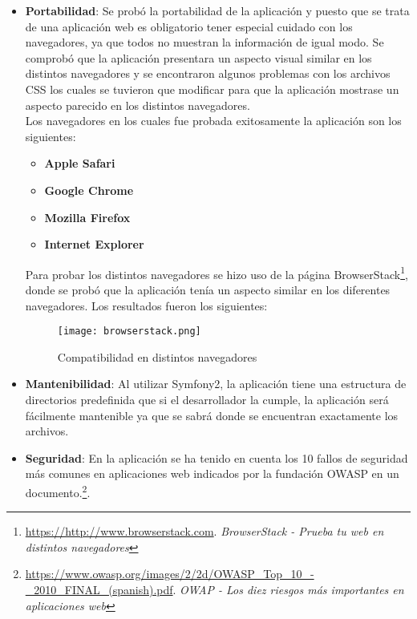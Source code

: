 \begin{itemize}
\item \textbf{Portabilidad}: Se probó la portabilidad de la aplicación y puesto que se trata de una aplicación web es obligatorio tener especial cuidado con los navegadores, ya que todos no muestran la información de igual modo. Se comprobó que la aplicación presentara un aspecto visual similar en los distintos navegadores y se encontraron algunos problemas con los archivos CSS los cuales se tuvieron que modificar para que la aplicación mostrase un aspecto parecido en los distintos navegadores.\\
Los navegadores en los cuales fue probada exitosamente la aplicación son los siguientes:

\begin{itemize}
\item \textbf{Apple Safari}
\item \textbf{Google Chrome} 
\item \textbf{Mozilla Firefox}
\item \textbf{Internet Explorer}
 \end{itemize}

Para probar los distintos navegadores se hizo uso de la página BrowserStack\footnote{\url{https://http://www.browserstack.com}. \textit{BrowserStack - Prueba tu web en distintos navegadores}}, donde se probó que la aplicación tenía un aspecto similar en los diferentes navegadores. Los resultados fueron los siguientes:
 
\begin{figure}[!htb]
  \centering
    \texttt{[image: browserstack.png]}
  \caption{Compatibilidad en distintos navegadores}
  \label{a}
\end{figure}

\item \textbf{Mantenibilidad}:  Al utilizar Symfony2, la aplicación tiene una estructura de directorios predefinida que si el desarrollador la cumple, la aplicación será fácilmente mantenible ya que se sabrá donde se encuentran exactamente los archivos.

\item \textbf{Seguridad}: En la aplicación se ha tenido en cuenta los 10 fallos de seguridad más comunes en aplicaciones web indicados por la fundación OWASP en un documento.\footnote{\url{https://www.owasp.org/images/2/2d/OWASP_Top_10_-_2010_FINAL_(spanish).pdf}. \textit{OWAP - Los diez riesgos más importantes en aplicaciones web}}. 


\end{itemize}
